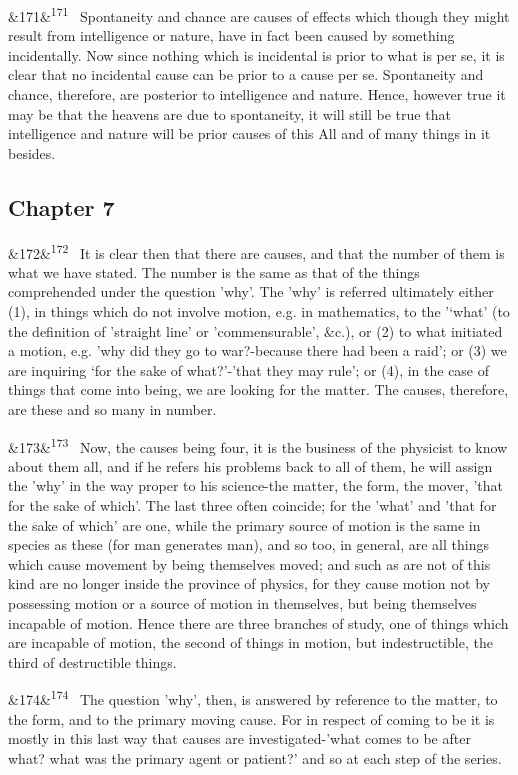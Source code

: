 \documentclass[12pt]{article}
\newcommand{\para}[1][]{\par\noindent\ifx&#1&\else\textsuperscript{\footnotesize #1}~\fi}
\begin{document}
\para[171] Spontaneity and chance are causes of effects which though they might result from intelligence or nature, have in fact been caused by something incidentally. Now since nothing which is incidental is prior to what is per se, it is clear that no incidental cause can be prior to a cause per se. Spontaneity and chance, therefore, are posterior to intelligence and nature. Hence, however true it may be that the heavens are due to spontaneity, it will still be true that intelligence and nature will be prior causes of this All and of many things in it besides.

\subsection*{Chapter 7}

\para[172] It is clear then that there are causes, and that the number of them is what we have stated. The number is the same as that of the things comprehended under the question 'why'. The 'why' is referred ultimately either (1), in things which do not involve motion, e.g. in mathematics, to the '‘what' (to the definition of 'straight line' or 'commensurable', \&c.), or (2) to what initiated a motion, e.g. 'why did they go to war?-because there had been a raid’; or (3) we are inquiring ‘for the sake of what?'-'that they may rule’; or (4), in the case of things that come into being, we are looking for the matter. The causes, therefore, are these and so many in number.

\para[173] Now, the causes being four, it is the business of the physicist to know about them all, and if he refers his problems back to all of them, he will assign the 'why' in the way proper to his science-the matter, the form, the mover, 'that for the sake of which’. The last three often coincide; for the 'what' and 'that for the sake of which' are one, while the primary source of motion is the same in species as these (for man generates man), and so too, in general, are all things which cause movement by being themselves moved; and such as are not of this kind are no longer inside the province of physics, for they cause motion not by possessing motion or a source of motion in themselves, but being themselves incapable of motion. Hence there are three branches of study, one of things which are incapable of motion, the second of things in motion, but indestructible, the third of destructible things.

\para[174] The question 'why’, then, is answered by reference to the matter, to the form, and to the primary moving cause. For in respect of coming to be it is mostly in this last way that causes are investigated-'what comes to be after what? what was the primary agent or patient?’ and so at each step of the series.
\end{document}

